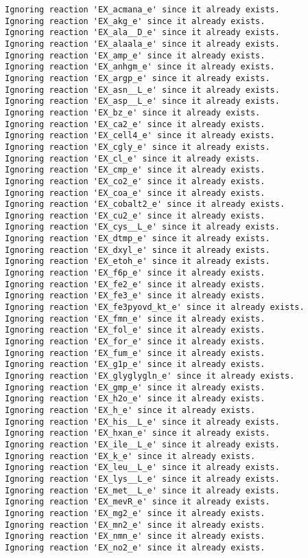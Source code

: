 \documentclass[
  letterpaper,
  DIV=11,
  numbers=noendperiod]{scrartcl}
\begin{document}
\begin{verbatim}
Ignoring reaction 'EX_acmana_e' since it already exists.
Ignoring reaction 'EX_akg_e' since it already exists.
Ignoring reaction 'EX_ala__D_e' since it already exists.
Ignoring reaction 'EX_alaala_e' since it already exists.
Ignoring reaction 'EX_amp_e' since it already exists.
Ignoring reaction 'EX_anhgm_e' since it already exists.
Ignoring reaction 'EX_argp_e' since it already exists.
Ignoring reaction 'EX_asn__L_e' since it already exists.
Ignoring reaction 'EX_asp__L_e' since it already exists.
Ignoring reaction 'EX_bz_e' since it already exists.
Ignoring reaction 'EX_ca2_e' since it already exists.
Ignoring reaction 'EX_cell4_e' since it already exists.
Ignoring reaction 'EX_cgly_e' since it already exists.
Ignoring reaction 'EX_cl_e' since it already exists.
Ignoring reaction 'EX_cmp_e' since it already exists.
Ignoring reaction 'EX_co2_e' since it already exists.
Ignoring reaction 'EX_coa_e' since it already exists.
Ignoring reaction 'EX_cobalt2_e' since it already exists.
Ignoring reaction 'EX_cu2_e' since it already exists.
Ignoring reaction 'EX_cys__L_e' since it already exists.
Ignoring reaction 'EX_dtmp_e' since it already exists.
Ignoring reaction 'EX_dxyl_e' since it already exists.
Ignoring reaction 'EX_etoh_e' since it already exists.
Ignoring reaction 'EX_f6p_e' since it already exists.
Ignoring reaction 'EX_fe2_e' since it already exists.
Ignoring reaction 'EX_fe3_e' since it already exists.
Ignoring reaction 'EX_fe3pyovd_kt_e' since it already exists.
Ignoring reaction 'EX_fmn_e' since it already exists.
Ignoring reaction 'EX_fol_e' since it already exists.
Ignoring reaction 'EX_for_e' since it already exists.
Ignoring reaction 'EX_fum_e' since it already exists.
Ignoring reaction 'EX_g1p_e' since it already exists.
Ignoring reaction 'EX_glyglygln_e' since it already exists.
Ignoring reaction 'EX_gmp_e' since it already exists.
Ignoring reaction 'EX_h2o_e' since it already exists.
Ignoring reaction 'EX_h_e' since it already exists.
Ignoring reaction 'EX_his__L_e' since it already exists.
Ignoring reaction 'EX_hxan_e' since it already exists.
Ignoring reaction 'EX_ile__L_e' since it already exists.
Ignoring reaction 'EX_k_e' since it already exists.
Ignoring reaction 'EX_leu__L_e' since it already exists.
Ignoring reaction 'EX_lys__L_e' since it already exists.
Ignoring reaction 'EX_met__L_e' since it already exists.
Ignoring reaction 'EX_mevR_e' since it already exists.
Ignoring reaction 'EX_mg2_e' since it already exists.
Ignoring reaction 'EX_mn2_e' since it already exists.
Ignoring reaction 'EX_nmn_e' since it already exists.
Ignoring reaction 'EX_no2_e' since it already exists.

\end{verbatim}
\end{document}
